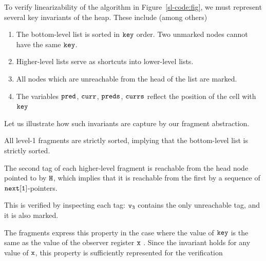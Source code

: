 To verify linearizability of the algorithm in Figure~\ref{sl-code:fig},
we must represent several key invariants of the heap. These include (among others)
\begin{enumerate}
\item The bottom-level list is sorted in $\tt key$ order. Two unmarked nodes cannot have the same $\tt key$.
\item Higher-level lists serve as shortcuts into lower-level lists.
\item All nodes which are unreachable from the head of the list are marked.
\item The variables $\tt pred$, $\tt curr$, $\tt preds$, $\tt currs$ reflect the position of the
  cell with $\tt key$
\end{enumerate}
Let us illustrate how such invariants are capture by our fragment abstraction.
\begin{inparaenum}[1)]
\item
  All level-1 fragments are strictly sorted, implying that the bottom-level list is strictly sorted.
\item
  The second tag of each higher-level fragment is reachable from the
  head node pointed to by $\tt H$, which implies that it is reachable from the first
  by a sequence of $\tt next[1]$-pointers.
\item
  This is verified by inspecting each tag: $\mathtt{v}_{3}$ contains the only unreachable tag, and it is also marked.
\item
  The fragments express this property in the case where the value of $\tt key$ is
  the same as the value of the observer register $\tt x$ . Since the invariant holds for any value of $\tt x$, this property
  is sufficiently represented for the verification
\end{inparaenum}

